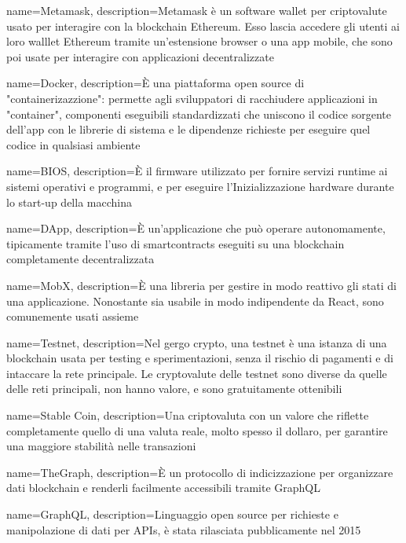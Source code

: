 {
  name={Metamask},
  description={Metamask è un software wallet per criptovalute usato per interagire con la blockchain Ethereum. Esso lascia accedere gli utenti ai loro walllet Ethereum tramite un'estensione browser o una app mobile, che sono poi usate per interagire con applicazioni decentralizzate}
}

{
  name={Docker},
  description={È una piattaforma open source di "containerizazzione": permette agli sviluppatori di racchiudere applicazioni in "container", componenti eseguibili standardizzati che uniscono il codice sorgente dell'app con le librerie di sistema e le dipendenze richieste per eseguire quel codice in qualsiasi ambiente}
}

{
  name={BIOS},
  description={È il firmware utilizzato per fornire servizi runtime ai sistemi operativi e programmi, e per eseguire l'Inizializzazione hardware durante lo start-up della macchina}
}

{
  name={DApp},
  description={È un'applicazione che può operare autonomamente, tipicamente tramite l'uso di smartcontracts eseguiti su una blockchain completamente decentralizzata}
}

{
  name={MobX},
  description={È una libreria per gestire in modo reattivo gli stati di una applicazione. Nonostante sia usabile in modo indipendente da React, sono comunemente usati assieme}
}

{
  name={Testnet},
  description={Nel gergo crypto, una testnet è una istanza di una blockchain usata per testing e sperimentazioni, senza il rischio di pagamenti e di intaccare la rete principale. Le cryptovalute delle testnet sono diverse da quelle delle reti principali, non hanno valore, e sono gratuitamente ottenibili}
}

{
  name={Stable Coin},
  description={Una criptovaluta con un valore che riflette completamente quello di una valuta reale, molto spesso il dollaro, per garantire una maggiore stabilità nelle transazioni}
}

{
  name={TheGraph},
  description={È un protocollo di indicizzazione per organizzare dati blockchain e renderli facilmente accessibili tramite GraphQL\glo}
}

{
  name={GraphQL},
  description={Linguaggio open source per richieste e manipolazione di dati per APIs\glo, è stata rilasciata pubblicamente nel 2015}
}

